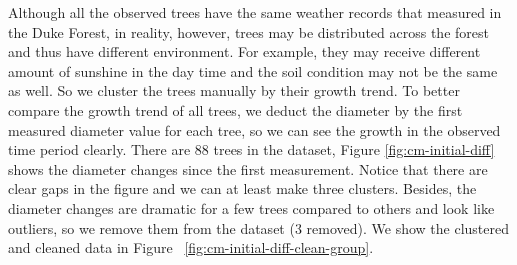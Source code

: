 \documentclass{article}
\begin{document}
Although all the observed trees have the same weather records that measured in the Duke Forest, in reality, however, trees may be distributed across the forest and thus have different environment. For example, they may receive different amount of sunshine in the day time and the soil condition may not be the same as well. So we cluster the trees manually by their growth trend. To better compare the growth trend of all trees, we deduct the diameter by the first measured diameter value for each tree, so we can see the growth in the observed time period clearly. There are 88 trees in the dataset, Figure \ref{fig:cm-initial-diff} shows the diameter changes since the first measurement. Notice that there are clear gaps in the figure and we can at least make three clusters. Besides, the diameter changes are dramatic for a few trees compared to others and look like outliers, so we remove them from the dataset (3 removed). We show the clustered and cleaned data in Figure ~\ref{fig:cm-initial-diff-clean-group}.
\end{document}
